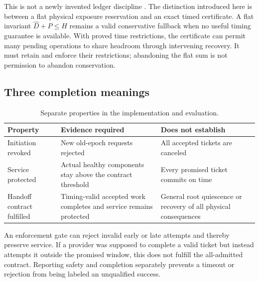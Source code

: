 This is not a newly invented ledger discipline \cite{escrow,sagas}. The distinction introduced here is between a flat physical exposure reservation and an exact timed certificate. A flat invariant $\widehat D+P\le H$ remains a valid conservative fallback when no useful timing guarantee is available. With proved time restrictions, the certificate can permit many pending operations to share headroom through intervening recovery. It must retain and enforce their restrictions; abandoning the flat sum is not permission to abandon conservation.

\subsection{Three completion meanings}
\begin{table}[ht]
\centering\small
\caption{Separate properties in the implementation and evaluation.}
\begin{tabularx}{\linewidth}{@{}lXX@{}}\toprule
Property & Evidence required & Does not establish\\\midrule
Initiation revoked & New old-epoch requests rejected & All accepted tickets are canceled\\
Service protected & Actual healthy components stay above the contract threshold & Every promised ticket commits on time\\
Handoff contract fulfilled & Timing-valid accepted work completes and service remains protected & General root quiescence or recovery of all physical consequences\\\bottomrule
\end{tabularx}
\end{table}
An enforcement gate can reject invalid early or late attempts and thereby preserve service. If a provider was supposed to complete a valid ticket but instead attempts it outside the promised window, this does not fulfill the all-admitted contract. Reporting safety and completion separately prevents a timeout or rejection from being labeled an unqualified success.

